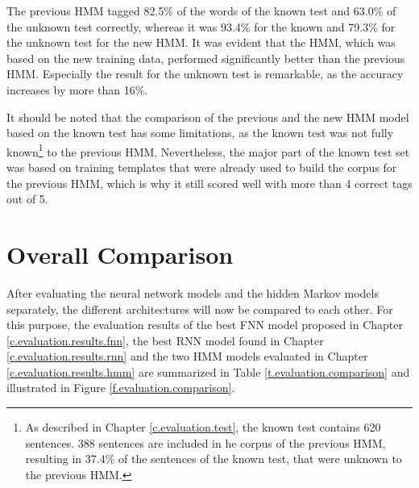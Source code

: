 The previous HMM tagged 82.5\% of the words of the known test and 63.0\% of the unknown test correctly, whereas it was 93.4\% for the known and 79.3\% for the unknown test for the new HMM. It was evident that the HMM, which was based on the new training data, performed significantly better than the previous HMM. Especially the result for the unknown test is remarkable, as the accuracy increases by more than 16\%.

It should be noted that the comparison of the previous and the new HMM model based on the known test has some limitations, as the known test was not fully known\footnote{As described in Chapter \ref{c.evaluation.test}, the known test contains 620 sentences. 388 sentences are included in he corpus of the previous HMM, resulting in 37.4\% of the sentences of the known test, that were unknown to the previous HMM.} to the previous HMM. Nevertheless, the major part of the known test set was based on training templates that were already used to build the corpus for the previous HMM, which is why it still scored well with more than 4 correct tags out of 5.

\section{Overall Comparison}\label{c.evaluation.comparison}
After evaluating the neural network models and the hidden Markov models separately, the different architectures will now be compared to each other. For this purpose, the evaluation results of the best FNN model proposed in Chapter \ref{c.evaluation.results.fnn}, the best RNN model found in Chapter \ref{c.evaluation.results.rnn} and the two HMM models evaluated in Chapter \ref{c.evaluation.results.hmm} are summarized in Table \ref{t.evaluation.comparison} and illustrated in Figure \ref{f.evaluation.comparison}.

